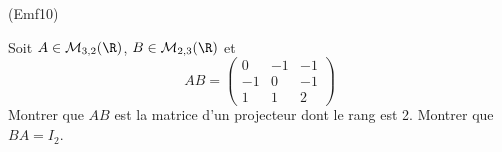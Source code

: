 \begin{tiny}(Emf10)\end{tiny}
Soit $A\in \mathcal{M}_{3,2}(\R)$, $B\in \mathcal{M}_{2,3}(\R)$ et
\begin{displaymath}
AB =
\begin{pmatrix}
0 & -1 & -1 \\
-1 & 0 & -1 \\
1 & 1 & 2
\end{pmatrix}
\end{displaymath}
Montrer que $AB$ est la matrice d'un projecteur dont le rang est 2. Montrer que $BA=I_{2}$.

